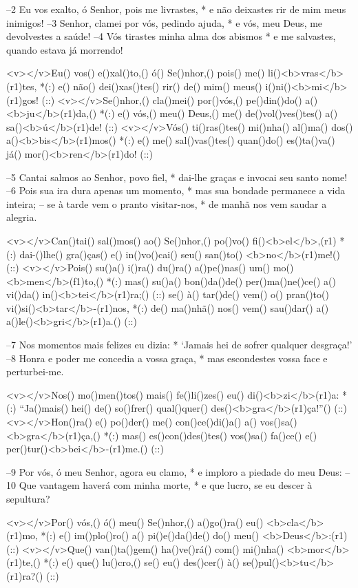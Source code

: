 –2 Eu vos exalto, ó Senhor, pois me livrastes, *
e não deixastes rir de mim meus inimigos!
–3 Senhor, clamei por vós, pedindo ajuda, *
e vós, meu Deus, me devolvestes a saúde!
–4 Vós tirastes minha alma dos abismos *
e me salvastes, quando estava já morrendo!

<v></v>Eu() vos() e()xal()to,() ó() Se()nhor,() pois() me() li()<b>vras</b>(r1)tes, *(:)
e() não() dei()xas()tes() rir() de() mim() meus() i()ni()<b>mi</b>(r1)gos! (::)
<v></v>Se()nhor,() cla()mei() por()vós,() pe()din()do() a()<b>ju</b>(r1)da,() *(:)
e() vós,() meu() Deus,() me() de()vol()ves()tes() a() sa()<b>ú</b>(r1)de! (::)
<v></v>Vós() ti()ras()tes() mi()nha() al()ma() dos() a()<b>bis</b>(r1)mos() *(:)
e() me() sal()vas()tes() quan()do() es()ta()va() já() mor()<b>ren</b>(r1)do! (::)

–5 Cantai salmos ao Senhor, povo fiel, *
dai-lhe graças e invocai seu santo nome!
–6 Pois sua ira dura apenas um momento, *
mas sua bondade permanece a vida inteira;
– se à tarde vem o pranto visitar-nos, *
de manhã nos vem saudar a alegria.

<v></v>Can()tai() sal()mos() ao() Se()nhor,() po()vo() fi()<b>el</b>,(r1) *(:)
dai-()lhe() gra()ças() e() in()vo()cai() seu() san()to() <b>no</b>(r1)me!() (::)
<v></v>Pois() su()a() i()ra() du()ra() a()pe()nas() um() mo()<b>men</b>(f1)to,() *(:)
mas() su()a() bon()da()de() per()ma()ne()ce() a() vi()da() in()<b>tei</b>(r1)ra;() (::)
se() à() tar()de() vem() o() pran()to() vi()si()<b>tar</b>-(r1)nos, *(:)
de() ma()nhã() nos() vem() sau()dar() a() a()le()<b>gri</b>(r1)a.() (::)

–7 Nos momentos mais felizes eu dizia: *
‘Jamais hei de sofrer qualquer desgraça!’
–8 Honra e poder me concedia a vossa graça, *
mas escondestes vossa face e perturbei-me.

<v></v>Nos() mo()men()tos() mais() fe()li()zes() eu() di()<b>zi</b>(r1)a: *(:)
``Ja()mais() hei() de() so()frer() qual()quer() des()<b>gra</b>(r1)ça!''() (::)
<v></v>Hon()ra() e() po()der() me() con()ce()di()a() a() vos()sa() <b>gra</b>(r1)ça,() *(:)
mas() es()con()des()tes() vos()sa() fa()ce() e() per()tur()<b>bei</b>-(r1)me.() (::)

–9 Por vós, ó meu Senhor, agora eu clamo, *
e imploro a piedade do meu Deus:
–10 Que vantagem haverá com minha morte, *
e que lucro, se eu descer à sepultura?

<v></v>Por() vós,() ó() meu() Se()nhor,() a()go()ra() eu() <b>cla</b>(r1)mo, *(:)
e() im()plo()ro() a() pi()e()da()de() do() meu() <b>Deus</b>:(r1) (::)
<v></v>Que() van()ta()gem() ha()ve()rá() com() mi()nha() <b>mor</b>(r1)te,() *(:)
e() que() lu()cro,() se() eu() des()cer() à() se()pul()<b>tu</b>(r1)ra?() (::)


